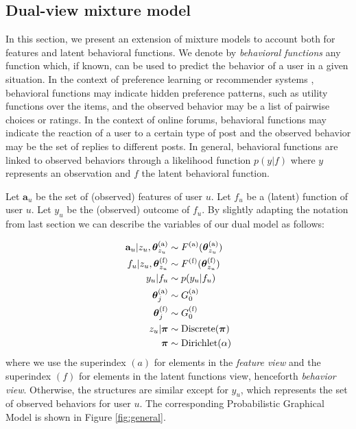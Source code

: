 \documentclass[smallextended]{svjour3}          %
\begin{document}
\subsection{Dual-view mixture model}\label{sec:dual-view}
In this section, we present an extension of mixture models to account both for features and latent behavioral functions. We denote by \textit{behavioral functions} any function which, if known, can be used to predict the behavior of a user in a given situation. In the context of preference learning \citep{Bonilla2010,Abbasnejad2013a} or recommender systems \citep{Cheung2004}, behavioral functions may indicate hidden preference patterns, such as utility functions over the items,  and the observed behavior may be a list of pairwise choices or ratings. In the context of online forums, behavioral functions may indicate the reaction of a user to a certain type of post and the observed behavior may be the set of replies to different posts. In general, behavioral functions are linked to observed behaviors through a likelihood function $p(y | f)$ where $y$ represents an observation and $f$ the latent behavioral function. 

Let $\mathbf{a}_u$ be the set of (observed) features of user $u$. Let $f_u$ be a (latent) function of user $u$. Let $y_u$ be the (observed) outcome of $f_u$. By slightly adapting the notation from last section we can describe the variables of our dual model as follows: 

\begin{align}
\mathbf{a}_u | z_u, \boldsymbol{\theta}_{z_u}^{\text{(a)}} &\sim F^{\text{(a)}}(\boldsymbol{\theta}_{z_u}^{\text{(a)}})\notag\\
f_u | z_u, \boldsymbol{\theta}_{z_u}^{\text{(f)}} &\sim F^{\text{(f)}}(\boldsymbol{\theta}_{z_u}^{\text{(f)}})\notag\\
y_u | f_u &\sim p(y_u | f_u)\notag\\
\boldsymbol{\theta}_j^{\text{(a)}} &\sim G_0^{\text{(a)}}\notag\\
\boldsymbol{\theta}_j^{\text{(f)}} &\sim G_0^{\text{(f)}}\notag\\
z_u | \boldsymbol{\pi} &\sim \text{Discrete}(\boldsymbol{\pi})\notag\\
\boldsymbol{\pi} &\sim \text{Dirichlet}(\alpha)
\end{align}
where we use the superindex $(a)$ for elements in the \textit{feature view} and the superindex $(f)$ for elements in the latent functions view, henceforth \textit{behavior view}. Otherwise, the structures are  similar except for $y_u$, which represents the set of observed behaviors for user $u$. The corresponding Probabilistic Graphical Model is shown in Figure \ref{fig:general}.
\end{document}
